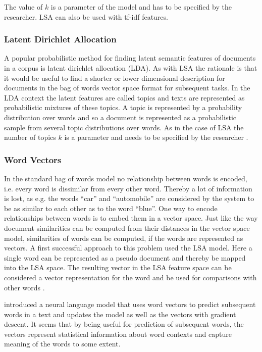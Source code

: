 The value of $k$ is a parameter of the model and has to be specified
by the researcher. LSA can also be used with tf-idf features.


\subsubsection*{Latent Dirichlet Allocation}

A popular probabilistic method for finding latent semantic features
of documents in a corpus is latent dirichlet allocation (LDA). As
with LSA the rationale is that it would be useful to find a shorter
or lower dimensional description for documents in the bag of words
vector space format for subsequent tasks. In the LDA context the latent
features are called topics and texts are represented as probabilistic
mixtures of these topics. A topic is represented by a probability
distribution over words and so a document is represented as a probabilistic
sample from several topic distributions over words. As in the case of LSA the
number of topics $k$ is a parameter and needs to be specified by
the researcher \citep{Blei2003}. 


\subsubsection*{Word Vectors}

In the standard bag of words model no relationship between words is
encoded, i.e. every word is dissimilar from every other word. Thereby
a lot of information is lost, as e.g. the words ``car'' and ``automobile''
are considered by the system to be as similar to each other as to
the word ``blue''. One way to encode relationships between words
is to embed them in a vector space. Just like the way document similarities
can be computed from their distances in the vector space model, similarities
of words can be computed, if the words are represented as vectors.
A first successful approach to this problem used the LSA model. Here
a single word can be represented as a pseudo document and thereby
be mapped into the LSA space. The resulting vector in the LSA feature
space can be considered a vector representation for the word and be
used for comparisons with other words \citep{Deerwester1990}.

\citet{Bengio2003} introduced a neural language model that uses
word vectors to predict subsequent words in a text and updates the
model as well as the vectors with gradient descent. It seems that
by being useful for prediction of subsequent words, the vectors represent
statistical information about word contexts and capture meaning of
the words to some extent.

